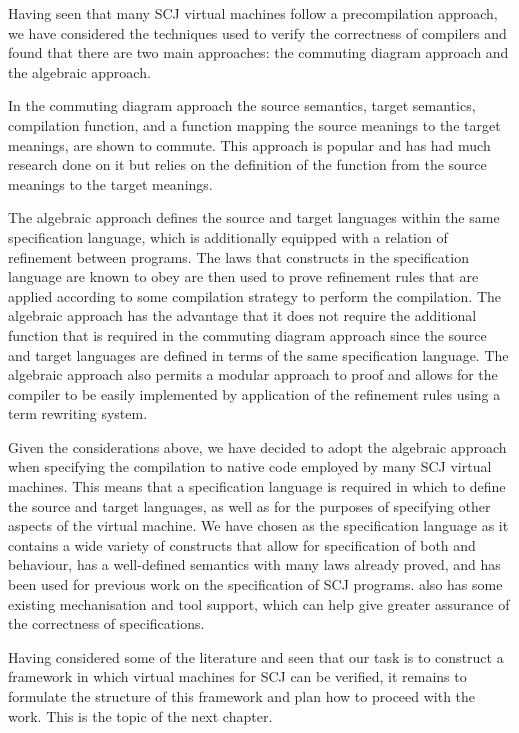 \documentclass[a4paper,10pt]{report}
\begin{document}
Having seen that many SCJ virtual machines follow a precompilation approach, we
have considered the techniques used to verify the correctness of compilers and
found that there are two main approaches: the commuting diagram approach and the
algebraic approach.

In the commuting diagram approach the source semantics, target semantics,
compilation function, and a function mapping the source meanings to the target
meanings, are shown to commute.  This approach is popular and has had much
research done on it but relies on the definition of the function from the source
meanings to the target meanings.

The algebraic approach defines the source and target languages within the same
specification language, which is additionally equipped with a relation of
refinement between programs.  The laws that constructs in the specification
language are known to obey are then used to prove refinement rules that are
applied according to some compilation strategy to perform the compilation.  The
algebraic approach has the advantage that it does not require the additional
function that is required in the commuting diagram approach since the source and
target languages are defined in terms of the same specification language.  The
algebraic approach also permits a modular approach to proof and allows for the
compiler to be easily implemented by application of the refinement rules using a
term rewriting system.

Given the considerations above, we have decided to adopt the algebraic approach
when specifying the compilation to native code employed by many SCJ virtual
machines.  This means that a specification language is required in which to
define the source and target languages, as well as for the purposes of
specifying other aspects of the virtual machine.  We have chosen \Circus{} as
the specification language as it contains a wide variety of constructs that
allow for specification of both and behaviour, has a well-defined semantics with
many laws already proved, and has been used for previous work on the
specification of SCJ programs. \Circus{} also has some existing mechanisation
and tool support, which can help give greater assurance of the correctness of
specifications.

Having considered some of the literature and seen that our task is to construct
a framework in which virtual machines for SCJ can be verified, it remains to
formulate the structure of this framework and plan how to proceed with the
work.  This is the topic of the next chapter.
\end{document}
